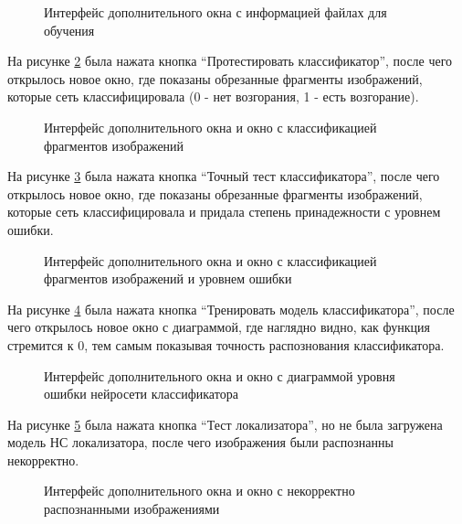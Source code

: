 \begin{figure}[H]
\caption{Интерфейс дополнительного окна с информацией файлах для обучения}
\label{systemtest14:image}
\end{figure}

На рисунке \ref{systemtest15:image} была нажата кнопка ``Протестировать классификатор'', после чего открылось новое окно, где показаны обрезанные фрагменты изображений, которые сеть классифицировала (0 - нет возгорания, 1 - есть возгорание).

\begin{figure}[H]
\caption{Интерфейс дополнительного окна и окно с классификацией фрагментов изображений}
\label{systemtest15:image}
\end{figure}

На рисунке \ref{systemtest16:image} была нажата кнопка ``Точный тест классификатора'', после чего открылось новое окно, где показаны обрезанные фрагменты изображений, которые сеть классифицировала и придала степень принадежности с уровнем ошибки.

\begin{figure}[H]
\caption{Интерфейс дополнительного окна и окно с классификацией фрагментов изображений и уровнем ошибки}
\label{systemtest16:image}
\end{figure}

На рисунке \ref{systemtest17:image} была нажата кнопка ``Тренировать модель классификатора'', после чего открылось новое окно с диаграммой, где наглядно видно, как функция стремится к 0, тем самым показывая точность распознования классификатора.

\begin{figure}[H]
\caption{Интерфейс дополнительного окна и окно с диаграммой уровня ошибки нейросети классификатора}
\label{systemtest17:image}
\end{figure}

На рисунке \ref{systemtest18:image} была нажата кнопка ``Тест локализатора'', но не была загружена модель НС локализатора, после чего изображения были распознанны некорректно.

\begin{figure}[H]
\caption{Интерфейс дополнительного окна и окно с некорректно распознанными изображениями}
\label{systemtest18:image}
\end{figure}

